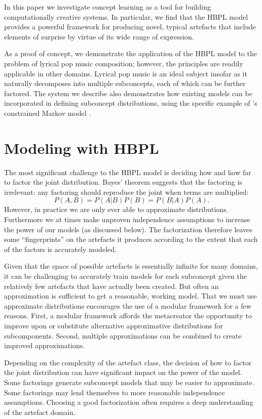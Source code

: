 \documentclass[phd,electronic,oneside,twosidetoc,letterpaper,chaptercenter,parttop,lof,lot]{byumsphd}
\begin{document}
In this paper we investigate concept learning as a tool for building computationally creative systems. In particular, we find that the HBPL model provides a powerful framework for producing novel, typical artefacts that include elements of surprise by virtue of its wide range of expression.

As a proof of concept, we demonstrate the application of the HBPL model to the problem of lyrical pop music composition; however, the principles are readily applicable in other domains. Lyrical pop music is an ideal subject insofar as it naturally decomposes into multiple subconcepts, each of which can be further factored. The system we describe also demonstrates how existing models can be incorporated in defining subconcept distributions, using the specific example of \citeauthor{pachet2011finite}'s constrained Markov model \cite{pachet2011finite}.

\section{Modeling with HBPL}

The most significant challenge to the HBPL model is deciding how and how far to factor the joint distribution. Bayes' theorem suggests that the factoring is irrelevant: any factoring should reproduce the joint when terms are multiplied:
\[ P(A,B) = P(A|B)P(B) = P(B|A)P(A). \]
However, in practice we are only ever able to approximate distributions. Furthermore we at times make unproven independence assumptions to increase the power of our models (as discussed below). The factorization therefore leaves some ``fingerprints'' on the artefacts it produces according to the extent that each of the factors is accurately modeled.

Given that the space of possible artefacts is essentially infinite for many domains, it can be challenging to accurately train models for each subconcept given the relatively few artefacts that have actually been created. But often an approximation is sufficient to get a reasonable, working model. That we must use approximate distributions encourages the use of a modular framework for a few reasons. First, a modular framework affords the metacreator the opportunity to improve upon or substitute alternative approximative distributions for subcomponents. Second, multiple approximations can be combined to create improved approximations.

Depending on the complexity of the artefact class, the decision of how to factor the joint distribution can have significant impact on the power of the model. Some factorings generate subconcept models that may be easier to approximate. Some factorings may lend themselves to more reasonable independence assumptions. Choosing a good factorization often requires a deep understanding of the artefact domain.
\end{document}

